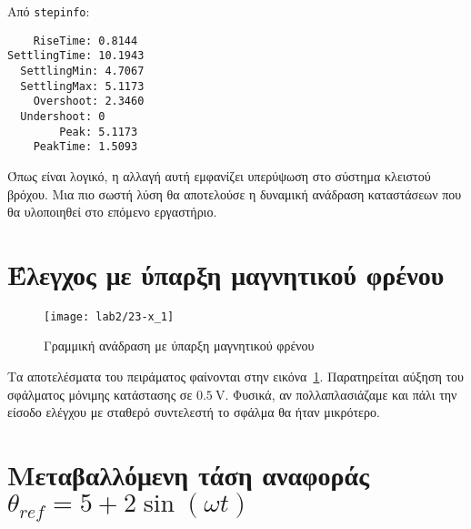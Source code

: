 Από \texttt{stepinfo}:
\begin{code}
\begin{verbatim}
    RiseTime: 0.8144
SettlingTime: 10.1943
  SettlingMin: 4.7067
  SettlingMax: 5.1173
    Overshoot: 2.3460
  Undershoot: 0
        Peak: 5.1173
    PeakTime: 1.5093
\end{verbatim}
\end{code}
Όπως είναι λογικό, η αλλαγή αυτή εμφανίζει υπερύψωση στο σύστημα κλειστού βρόχου.
Μια πιο σωστή λύση θα αποτελούσε η δυναμική ανάδραση καταστάσεων που θα υλοποιηθεί στο επόμενο εργαστήριο.

\section{Έλεγχος με ύπαρξη μαγνητικού φρένου}
\begin{figure}[htb]
  \centering
  \texttt{[image: lab2/23-x\_1]}%
  \caption{Γραμμική ανάδραση με ύπαρξη μαγνητικού φρένου}
  \label{fig:23}
\end{figure}

Τα αποτελέσματα του πειράματος φαίνονται στην εικόνα~\ref{fig:23}.
Παρατηρείται αύξηση του σφάλματος μόνιμης κατάστασης σε $\SI{0.5}{\volt}$.
Φυσικά, αν πολλαπλασιάζαμε και πάλι την είσοδο ελέγχου με σταθερό συντελεστή το σφάλμα θα ήταν μικρότερο.

\section[Μεταβαλλόμενη τάση αναφοράς]{Μεταβαλλόμενη τάση αναφοράς $\theta_{ref} = 5 + 2 \sin{\left(\omega t\right)}$}
